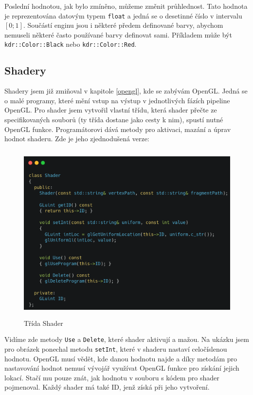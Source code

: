 \documentclass[12pt]{article}
\begin{document}
Poslední hodnotou, jak bylo zmíněno, můžeme změnit průhlednost. Tato hodnota je reprezentována datovým typem \texttt{float} a jedná se o desetinné číslo v intervalu $[0; 1]$. Součástí enginu jsou i některé předem definované barvy, abychom nemuseli některé často používané barvy definovat sami. Příkladem může být \texttt{kdr::Color::Black} nebo \texttt{kdr::Color::Red}.

\pagebreak

\subsection{Shadery}

Shadery jsem již zmiňoval v kapitole \ref{opengl}, kde se zabývám OpenGL. Jedná se o malé programy, které mění vstup na výstup v jednotlivých fázích pipeline OpenGL. Pro shader jsem vytvořil vlastní třídu, která shader přečte ze specifikovaných souborů (ty třída dostane jako cesty k nim), spustí nutné OpenGL funkce. Programátorovi dává metody pro aktivaci, mazání a úprav hodnot shaderu. Zde je jeho zjednodušená verze:

\vspace{0.5cm}
\begin{figure}[h]
    \centering
    \includegraphics[height=9cm]{images/shader.png}
    \caption{Třída Shader}
    \label{fig:Třída Shader}
\end{figure}

Vidíme zde metody \texttt{Use} a \texttt{Delete}, které shader aktivují a mažou. Na ukázku jsem pro obrázek ponechal metodu \texttt{setInt}, které v shaderu nastaví celočíslenou hodnotu. OpenGL musí vědět, kde danou hodnotu najde a díky metodám pro nastavování hodnot nemusí vývojář využívat OpenGL funkce pro získání jejich lokací. Stačí mu pouze znát, jak hodnotu v souboru s kódem pro shader pojmenoval. Každý shader má také ID, jenž získá při jeho vytvoření.
\end{document}

